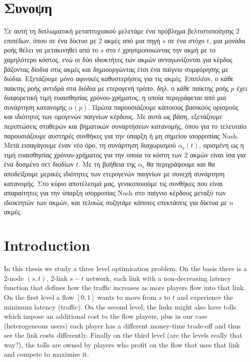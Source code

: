 \documentclass[10pt,a4paper]{book}
\newcommand{\as}{\mathrm{\alpha_s}}
\theoremstyle{definition}
\theoremstyle{comment}
\begin{document}
\chapter*{Συνοψη}
Σε αυτή τη διπλωματική μεταπτυχιακού μελετάμε ένα πρόβλημα βελτιστοποίησης $2$ επιπέδων, όπου σε ένα δίκτυο με $2$ ακμές από μια πηγή $s$ σε ένα στόχο $t$, μια μονάδα ροής θέλει να μετακινηθεί από το $s$ στο $t$ χρησιμοποιώντας την ακμή με το χαμηλότερο κόστος, ενώ οι δύο ιδιοκτήτες των ακμών ανταγωνίζονται για κέρδος βάζοντας δίοδια στις ακμές και δημιουργώντας έτσι ένα παίγνιο συμφόρησης με διόδια.
Εξετάζουμε μόνο αφινικές καθυστερήσεις για τις ακμές.
Επιπλέον, ο κάθε παίκτης ροής αντιδρά στα διόδια με ετερογενή τρόπο, δηλ. ο κάθε παίκτης ροής $p$ έχει διαφορετική τιμή ευαισθησίας χρόνου-χρήματος, η οποία περιγράφεται από μια συνάρτηση κατανομής $\alpha(p)$.
Πρώτα παρουσιάζουμε κάποιους βασικούς ορισμούς και ιδιότητες των ομογενών παιγνίων κέρδους. Mε αυτά ως βάση, εξετάζουμε περιπτώσεις σταθερών και βηματικών συναρτήσεων κατανομής, όπου για το τελευταίο παρουσιάζουμε αυστηρές συνθήκες για την ύπαρξη ή μη σημείου ισορροπίας Nash.
Μετά εισαγάγουμε έναν νέο όρο, τη συνάρτηση διαχωρισμού $\as(t)$, ορισμένη ως η τιμή ευαισθησίας χρόνου-χρήματος για την οποία τα κόστη των $2$ ακμών είναι ίσα για ένα δοσμένο σετ διοδίων $t$.
Με τη βοήθεια της $\as$ θα περιγράψουμε και θα αποδείξουμε μερικές ιδιότητες των ετερογενών παιγνίων με συνεχή συνάρτηση κατανομής.
Στο κύριο αποτέλεσμά μας, γενικοποιούμε τις συνθήκες που είναι απαραίτητες για την ύπαρξη ισορροπίας Nash στο παίγνιο κέρδους μεταξύ των ιδιοκτητών των ακμών, και τελικώς συζητάμε κάποιες επεκτάσεις για δίκτυα με $n$ ακμές.
\clearpage

\thispagestyle{empty}
\null
\clearpage


\clearpage
\thispagestyle{empty}

\pagestyle{fancy}

\tableofcontents
\clearpage

\thispagestyle{empty}
\null
\clearpage



\chapter{Introduction}

In this thesis we study a three level optimisation problem.
On the basis there is a 2-node $(s, t)$, 2-link $s-t$ network, each link with a non-decreasing latency function that defines how the traffic increases as more players flow into that link.
On the first level a flow $[0, 1]$ wants to move from $s$ to $t$ and experience the minimum latency (traffic).
On the second level, the links might also have tolls which impose an additional cost to the flow players, plus in our case (heterogeneous users) each player has a different money-time trade-off and thus see the link costs differently.
Finally on the third level (are the levels really that way?), the tolls are owned by players who profit on the flow that uses that link and compete to maximise it.
\end{document}
